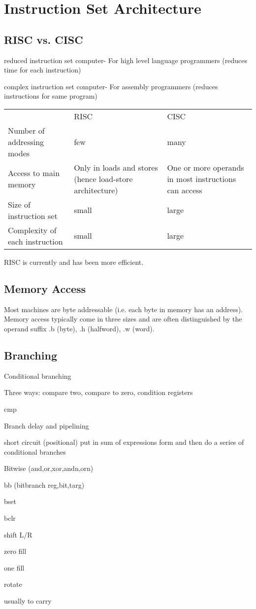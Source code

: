 \chapter{Instruction Set Architecture}
\label{c-isa}

\section{RISC vs. CISC}

\ben
\item[RISC] reduced instruction set computer- For high level language programmers (reduces time for each instruction)
\item[CISC] complex instruction set computer- For assembly programmers (reduces instructions for same program)
\een

\vspace{.2in}
\noindent
\begin{tabular}{lp{2in}p{2in}}
                               & RISC  & CISC  \\
Number of addressing modes     & few   & many  \\
Access to main memory          & Only in loads and stores (hence load-store architecture) 
                                       & One or more operands in most instructions can access \\
Size of instruction set        & small & large \\
Complexity of each instruction & small & large \\
\end{tabular}
\vspace{.2in}

RISC is currently and has been more efficient.


\section{Memory Access}

Most machines are byte addressable (i.e. each byte in memory has an address).  Memory access typically come in three sizes and are often distinguished by the operand suffix .b (byte), .h (halfword), .w (word).  

\section{Branching}

Conditional branching

Three ways: compare two, compare to zero, condition registers

cmp

Branch delay and pipelining

short circuit (positional) put in sum of expressions form and then
do a series of conditional branches

Bitwise (and,or,xor,andn,orn)

bb (bitbranch reg,bit,targ)

bset

bclr

shift L/R

zero fill

one fill

rotate

usually to carry
